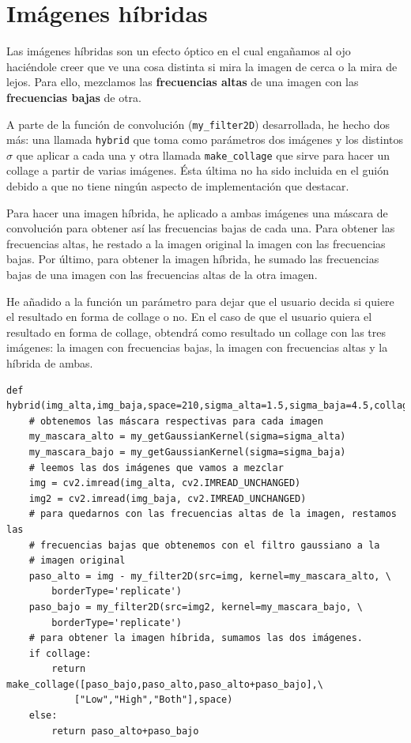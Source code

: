 \documentclass[11pt,a4paper]{article}
\theoremstyle{plain}
\theoremstyle{definition}
\begin{document}
\section{Imágenes híbridas}

Las imágenes híbridas son un efecto óptico en el cual engañamos al ojo haciéndole creer que ve una cosa distinta si mira la imagen de cerca o la mira de lejos. Para ello, mezclamos las \textbf{frecuencias altas} de una imagen con las \textbf{frecuencias bajas} de otra. 

A parte de la función de convolución (\texttt{my\_filter2D}) desarrollada, he hecho dos más: una llamada \texttt{hybrid} que toma como parámetros dos imágenes y los distintos $\sigma$ que aplicar a cada una y otra llamada \texttt{make\_collage} que sirve para hacer un collage a partir de varias imágenes. Ésta última no ha sido incluida en el guión debido a que no tiene ningún aspecto de implementación que destacar.

Para hacer una imagen híbrida, he aplicado a ambas imágenes una máscara de convolución para obtener así las frecuencias bajas de cada una. Para obtener las frecuencias altas, he restado a la imagen original la imagen con las frecuencias bajas. Por último, para obtener la imagen híbrida, he sumado las frecuencias bajas de una imagen con las frecuencias altas de la otra imagen. 

He añadido a la función un parámetro para dejar que el usuario decida si quiere el resultado en forma de collage o no. En el caso de que el usuario quiera el resultado en forma de collage, obtendrá como resultado un collage con las tres imágenes: la imagen con frecuencias bajas, la imagen con frecuencias altas y la híbrida de ambas.

\begin{verbatim}
def hybrid(img_alta,img_baja,space=210,sigma_alta=1.5,sigma_baja=4.5,collage=True):
    # obtenemos las máscara respectivas para cada imagen
    my_mascara_alto = my_getGaussianKernel(sigma=sigma_alta)
    my_mascara_bajo = my_getGaussianKernel(sigma=sigma_baja)
    # leemos las dos imágenes que vamos a mezclar
    img = cv2.imread(img_alta, cv2.IMREAD_UNCHANGED)
    img2 = cv2.imread(img_baja, cv2.IMREAD_UNCHANGED)
    # para quedarnos con las frecuencias altas de la imagen, restamos las 
    # frecuencias bajas que obtenemos con el filtro gaussiano a la 
    # imagen original
    paso_alto = img - my_filter2D(src=img, kernel=my_mascara_alto, \
        borderType='replicate')
    paso_bajo = my_filter2D(src=img2, kernel=my_mascara_bajo, \
        borderType='replicate')
    # para obtener la imagen híbrida, sumamos las dos imágenes.
    if collage:
        return make_collage([paso_bajo,paso_alto,paso_alto+paso_bajo],\
            ["Low","High","Both"],space)
    else:
        return paso_alto+paso_bajo
\end{verbatim}
\end{document}
